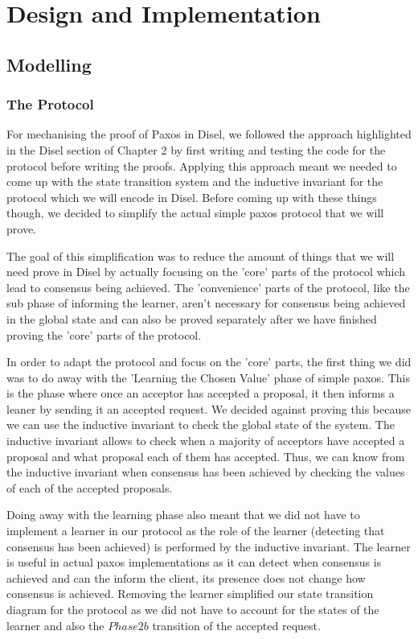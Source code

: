 \chapter{Design and Implementation}

\section{Modelling}

\subsection{The Protocol}
For mechanising the proof of Paxos in Disel, we followed the approach highlighted
in the Disel section of Chapter 2 by first writing and testing the code for
the protocol before writing the proofs. Applying this approach meant
we needed to come up with the state transition system and the inductive invariant
for the protocol which we will encode in Disel. Before coming up with these things
though, we decided to simplify the actual simple paxos protocol that we will prove.

The goal of this simplification was to reduce the amount of things that we will need
prove in Disel by actually focusing on the 'core' parts of the protocol which
lead to consensus being achieved. The 'convenience' parts of the protocol, like
the sub phase of informing the learner, aren't necessary for consensus being
achieved in the global state and can also be proved separately after we have
finished proving the 'core' parts of the protocol.

In order to adapt the protocol and focus on the 'core' parts, the first thing
we did was to do away with the 'Learning the Chosen Value' phase of simple paxos.
This is the phase where once an acceptor has accepted a proposal, it then informs
a leaner by sending it an accepted request. We decided against proving this
because we can use the inductive invariant to check the global state of the system.
The inductive invariant allows to check when a majority of acceptors have
accepted a proposal and what proposal each of them has accepted. Thus, we can know
from the inductive invariant when consensus has been achieved by checking the values
of each of the accepted proposals.

Doing away with the learning phase also meant that we did not have to implement
a learner in our protocol as the role of the learner (detecting that consensus
has been achieved) is performed by the inductive invariant.
The learner is useful in actual paxos implementations as
it can detect when consensus is achieved and can the inform the client, its
presence does not change how consensus is achieved. Removing the learner simplified
our state transition diagram for the protocol as we did not have to account
for the states of the learner and also the $Phase 2b$ transition of the
accepted request.

